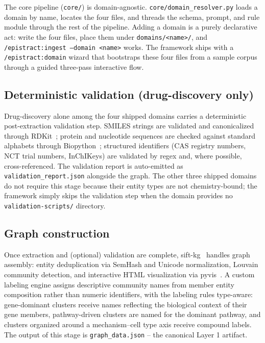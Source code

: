 The core pipeline (\texttt{core/}) is domain-agnostic. \texttt{core/domain\_resolver.py} loads a domain by name, locates the four files, and threads the schema, prompt, and rule module through the rest of the pipeline. Adding a domain is a purely declarative act: write the four files, place them under \texttt{domains/<name>/}, and \texttt{/epistract:ingest --domain <name>} works. The framework ships with a \texttt{/epistract:domain} wizard that bootstraps these four files from a sample corpus through a guided three-pass interactive flow.

\subsection{Deterministic validation (drug-discovery only)}

Drug-discovery alone among the four shipped domains carries a deterministic post-extraction validation step. SMILES strings are validated and canonicalized through RDKit~\cite{rdkit2024}; protein and nucleotide sequences are checked against standard alphabets through Biopython~\cite{biopython2009}; structured identifiers (CAS registry numbers, NCT trial numbers, InChIKeys) are validated by regex and, where possible, cross-referenced. The validation report is auto-emitted as \texttt{validation\_report.json} alongside the graph. The other three shipped domains do not require this stage because their entity types are not chemistry-bound; the framework simply skips the validation step when the domain provides no \texttt{validation-scripts/} directory.

\subsection{Graph construction}

Once extraction and (optional) validation are complete, sift-kg~\cite{sifkg2024} handles graph assembly: entity deduplication via SemHash and Unicode normalization, Louvain community detection, and interactive HTML visualization via pyvis~\cite{pyvis2018}. A custom labeling engine assigns descriptive community names from member entity composition rather than numeric identifiers, with the labeling rules type-aware: gene-dominant clusters receive names reflecting the biological context of their gene members, pathway-driven clusters are named for the dominant pathway, and clusters organized around a mechanism--cell type axis receive compound labels. The output of this stage is \texttt{graph\_data.json} -- the canonical Layer 1 artifact.


